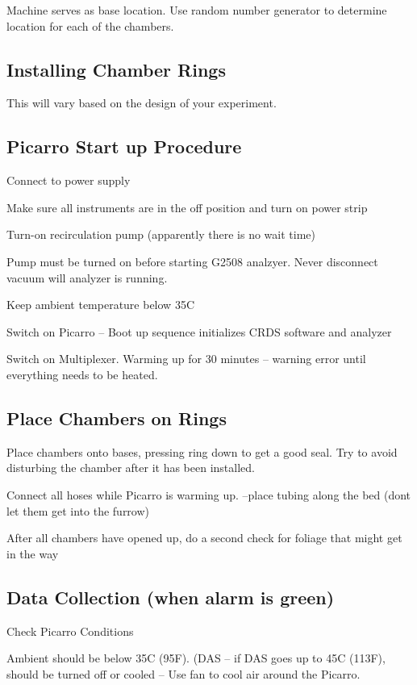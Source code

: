\documentclass[12pt]{../SOP3}\usepackage[]{graphicx}\usepackage[]{color}
\begin{document}
\NP Machine serves as base location.
\NP Use random number generator to determine location for each of the chambers.

\subsection*{Installing Chamber Rings}

\NP This will vary based on the design of your experiment. 

\subsection*{Picarro Start up Procedure}

\NP Connect to power supply

\NP Make sure all instruments are in the off position and turn on power strip

\NP Turn-on recirculation pump (apparently there is no wait time)

\NP Pump must be turned on before starting G2508 analzyer. Never disconnect vacuum will analyzer is running.

\NP Keep ambient temperature below 35\degree C

\NP Switch on Picarro  -- Boot up sequence initializes CRDS software and analyzer

\NP Switch on Multiplexer. Warming up for 30 minutes -- warning error until everything needs to be heated.

\subsection*{Place Chambers on Rings}

\NP Place chambers onto bases, pressing ring down to get a good seal. Try to avoid disturbing the chamber after it has been installed. 

\NP Connect all hoses while Picarro is warming up. --place tubing along the bed (dont let them get into the furrow)

\NP After all chambers have opened up, do a second check for foliage that might get in the way

\subsection*{Data Collection (when alarm is green)}

\NP Check Picarro Conditions

\NP Ambient should be below 35\degree C (95\degree F). (DAS -- if DAS goes up to 45\degree C (113\degree F), should be turned off or cooled -- Use fan to cool air around the Picarro.
                               
\end{document}
